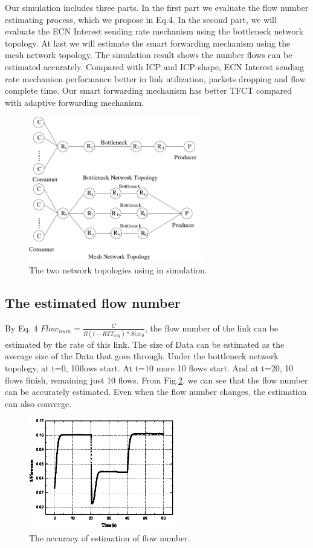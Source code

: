 Our simulation includes three parts. In the first part we evaluate the flow number estimating process, which we propose in Eq.4. In the second part, we will evaluate the ECN Interest sending rate mechanism using the bottleneck network topology. At last we will estimate the smart forwarding mechanism using the mesh network topology. The simulation result shows the number flows can be estimated accurately. Compared with ICP and ICP-shape, ECN Interest sending rate mechanism performance better in link utilization, packets dropping and flow complete time. Our smart forwarding mechanism has better TFCT compared with adaptive forwarding mechanism.
\begin{figure}[t]
\centering
\includegraphics[width=3in]{topology.pdf}
\centering
\caption{The two network topologies using in simulation.}
\label{fig-topology}
\end{figure}
\subsection{The estimated flow number}
By Eq. 4 $Flow_{num}=\frac{C}{R(t-RTT_{avg})\ast{Size_{d}}}$, the flow number of the link can be estimated by the rate of this link. The size of Data can be estimated as the average size of the Data that goes through. Under the bottleneck network topology, at t=0, 10flows start. At t=10 more 10 flows start. And at t=20, 10 flows finish, remaining just 10 flows. From Fig.\ref{fig-flownum}. we can see that the flow number can be accurately estimated. Even when the flow number changes, the estimation can also converge.
\begin{figure}[t]
\centering
\includegraphics[width=2.5in]{flownum-pic-cut.eps}
\centering
\caption{The accuracy of estimation of flow number.}
\label{fig-flownum}
\end{figure}


